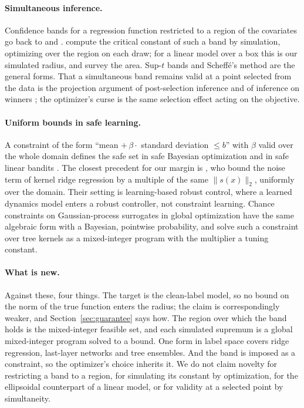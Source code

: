 \paragraph{Simultaneous inference.}
Confidence bands for a regression function restricted to a region of the
covariates go back to \citet{wynn1971simultaneous} and
\citet{naiman1987simultaneous}. \citet{liu2005simulation} compute the
critical constant of such a band by simulation, optimizing over the region on
each draw; for a linear model over a box this is our simulated radius, and
\citet{liu2010simultaneous} survey the area. Sup-$t$ bands
\citep{montielolea2019simultaneous} and Scheff\'e's method
\citep{scheffe1953method} are the general forms. That a simultaneous band
remains valid at a point selected from the data is the projection argument of
post-selection inference \citep{berk2013valid} and of inference on winners
\citep{andrews2024inference}; the optimizer's curse \citep{smith2006optimizer}
is the same selection effect acting on the objective.

\paragraph{Uniform bounds in safe learning.}
A constraint of the form ``mean $+\,\beta \cdot$ standard deviation
$\le b$'' with $\beta$ valid over the whole domain defines the safe set in
safe Bayesian optimization \citep{srinivas2012information, sui2015safe,
berkenkamp2023bayesian} and in safe linear bandits \citep{amani2019linear}.
The closest precedent for our margin is \citet{fiedler2021practical}, who
bound the noise term of kernel ridge regression by a multiple of the same
$\|s(x)\|_2$, uniformly over the domain. Their setting is learning-based
robust control, where a learned dynamics model enters a robust controller,
not constraint learning. Chance constraints on Gaussian-process surrogates in
global optimization \citep{schweidtmann2021deterministic, wiebe2022robust}
have the same algebraic form with a Bayesian, pointwise probability, and
\citet{thebelt2022tree} solve such a constraint over tree kernels as a
mixed-integer program with the multiplier a tuning constant.

\paragraph{What is new.}
Against these, four things. The target is the clean-label model, so no bound
on the norm of the true function enters the radius; the claim is
correspondingly weaker, and Section~\ref{sec:guarantee} says how. The region
over which the band holds is the mixed-integer feasible set, and each
simulated supremum is a global mixed-integer program solved to a bound. One
form in label space covers ridge regression, last-layer networks and tree
ensembles. And the band is imposed as a constraint, so the optimizer's
choice inherits it. We do not claim novelty for restricting a band to a
region, for simulating its constant by optimization, for the ellipsoidal
counterpart of a linear model, or for validity at a selected point by
simultaneity.

